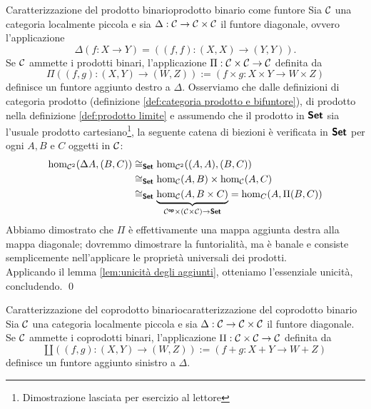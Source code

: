 \documentclass{article}
\renewcommand\C{\mc{C}}
\begin{document}
\begin{theorem}{Caratterizzazione del prodotto binario}{prodotto binario come funtore}
    Sia $\C$ una categoria localmente piccola e sia $\Delta :\C\to\C\times\C$ il funtore diagonale, ovvero l'applicazione
    \[ \Delta( f:X\to Y ) = ((f,f):(X,X)\to(Y,Y)).\]
    Se $\C$ ammette i prodotti binari, l'applicazione $\Pi : \C\times\C \to \C$ definita da
    \[\Pi((f,g):(X,Y)\to(W,Z)) := (f\times g : X\times Y \to W\times Z) \]
    definisce un funtore aggiunto destro a $\Delta$.
    \proof
    Osserviamo che dalle definizioni di categoria prodotto (definizione \ref{def:categoria prodotto e bifuntore}), di prodotto nella definizione \ref{def:prodotto limite} e assumendo che il prodotto in $\text{\sffamily\textbf{Set}}$ sia l'usuale prodotto cartesiano\footnote{Dimostrazione lasciata per esercizio al lettore}, la seguente catena di biezioni è verificata in $\text{\sffamily\textbf{Set}}$ per ogni $A,B$ e $C$ oggetti in $\C$:
    \[\begin{aligned}
        \hom_{\C^2}(\Delta A,(B,C)) & \cong_\setcat \hom_{\C^2}((A,A),(B,C))\\
        & \cong_\setcat \hom_\C(A,B)\times \hom_\C(A,C)\\
        & \cong_\setcat \underbrace{\hom_\C(A, B\times C)}_{\C^\op \times (\C\times\C) \to \setcat} = \hom_{C}(A,\Pi(B,C))
    \end{aligned} \]
    Abbiamo dimostrato che $\Pi$ è effettivamente una mappa aggiunta destra alla mappa diagonale; dovremmo dimostrare la funtorialità, ma è banale e consiste semplicemente nell'applicare le proprietà universali dei prodotti.\\
    Applicando il lemma \ref{lem:unicità degli aggiunti}, otteniamo l'essenziale unicità, concludendo.
    \qed
\end{theorem}

\begin{corollary}{Caratterizzazione del coprodotto binario}{caratterizzazione del coprodotto binario}
    Sia $\C$ una categoria localmente piccola e sia $\Delta :\C\to\C\times\C$ il funtore diagonale.\\
    Se $\C$ ammette i coprodotti binari, l'applicazione $\amalg : \C\times\C \to \C$ definita da
    \[\amalg ((f,g):(X,Y)\to(W,Z)) := (f + g : X + Y \to W + Z) \]
    definisce un funtore aggiunto sinistro a $\Delta$.
\end{corollary}

\nocite{*}
\printbibliography
\end{document}
